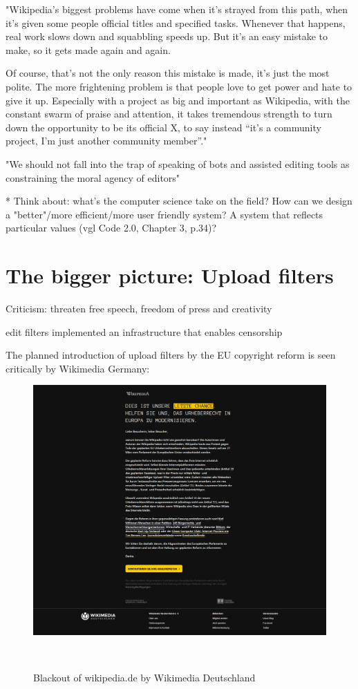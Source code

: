 "Wikipedia’s biggest problems have come when it’s strayed from this path, when it’s given some people official titles and specified tasks. Whenever that happens, real work slows down and squabbling speeds up. But it’s an easy mistake to make, so it gets made again and again.

Of course, that’s not the only reason this mistake is made, it’s just the most polite. The more frightening problem is that people love to get power and hate to give it up. Especially with a project as big and important as Wikipedia, with the constant swarm of praise and attention, it takes tremendous strength to turn down the opportunity to be its official X, to say instead “it’s a community project, I’m just another community member”."

\cite{GeiRib2010}
"We should not fall into the trap of speaking of bots and
assisted editing tools as constraining the moral agency of
editors"

* Think about: what's the computer science take on the field? How can we design a "better"/more efficient/more user friendly system? A system that reflects particular values (vgl Code 2.0, Chapter 3, p.34)?


\section{The bigger picture: Upload filters}

Criticism: threaten free speech, freedom of press and creativity

edit filters implemented an infrastructure that enables censorship

The planned introduction of upload filters by the EU copyright reform is seen critically by Wikimedia Germany:
\begin{figure}
\centering
  \includegraphics[width=0.9\columnwidth]{pics/Blackout_of_wikipediade_by_Wikimedia_Deutschland_-_March_2019.png}
  \caption{Blackout of wikipedia.de by Wikimedia Deutschland}~\label{fig:blackout-upload-filters}
\end{figure}

